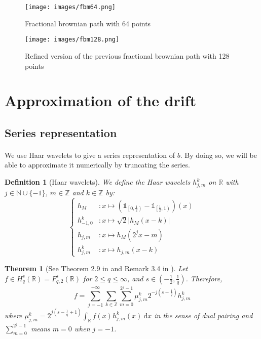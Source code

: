 \documentclass[11pt]{enstaPRE}
\newtheorem{defi}{Definition}
\newtheorem{theo}{Theorem}
\newcommand{\R}{\mathbb{R}}
\newcommand{\Z}{\mathbb{Z}}
\newcommand{\N}{\mathbb{N}}
\newcommand{\di}{\mathrm{d}}
\begin{document}
\begin{figure}
    \centering
    \texttt{[image: images/fbm64.png]}
    \caption{\label{64} Fractional brownian path with 64 points}
\end{figure}

\begin{figure}
    \centering
    \texttt{[image: images/fbm128.png]}
    \caption{\label{128} Refined version of the previous fractional brownian path with 128 points}
\end{figure}

\section{Approximation of the drift}
\subsection{Series representation}
\paragraph{}
We use Haar wavelets to give a series representation of $b$. By doing so, we will be able to approximate it numerically by truncating the series.

\begin{defi}[Haar wavelets]
    We define the Haar wavelets $h_{j,m}^k$ on $\R$ with $j\in\N\cup\{-1\}$, $m\in\Z$ and $k\in\Z$ by:
    \begin{equation}
    \begin{cases}
    h_M&:x\longmapsto\left(\mathds{1}_{\left[0,\frac{1}{2}\right)}-\mathds{1}_{\left[\frac{1}{2},1\right)}\right)(x)\\ h_{-1,0}^k&:x\longmapsto\sqrt{2}\left|h_M(x-k)\right|\\
    h_{j,m}&:x\longmapsto h_M(2^jx-m)\\
    h_{j,m}^k&:x\longmapsto h_{j,m}(x-k)
    \end{cases}
    \end{equation}
\end{defi}

\begin{theo}[See Theorem 2.9 in \cite{Tri-bas} and Remark 3.4 in \cite{Tri-fab}]\label{haar}
    Let $f\in H^s_q(\R)=F^s_{q,2}(\R)$ for $2\leq q \leq \infty$, and $s\in\left(-\frac{1}{2},\frac{1}{q}\right)$. Therefore,
    \begin{equation}
    f = \sum_{j=-1}^{+\infty}\sum_{k\in\Z}\sum_{m=0}^{2^j-1}\mu_{j,m}^k2^{-j\left(s-\frac{1}{q}\right)}h_{j,m}^k
    \end{equation}
    where $\mu_{j,m}^k = 2^{j\left(s-\frac{1}{q}+1\right)}\int_{\R}f(x)h_{j,m}^k(x)\ \di x$ in the sense of dual pairing and $\sum_{m=0}^{2^j-1}$ means $m=0$ when $j=-1$.
\end{theo}
\end{document}
